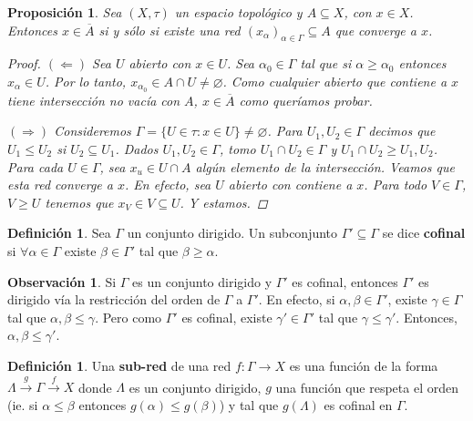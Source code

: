 \documentclass[12pt]{book}
\newtheorem{prop}[teo]{Proposición}
\theoremstyle{definition}
\newtheorem{obs}[teo]{Observación}
\newtheorem{defn}[teo]{Definición}
\let\emptyset\varnothing
\begin{document}
\begin{prop}
Sea $(X,\tau)$ un espacio topológico y $A\subseteq X$, con $x\in X$. Entonces $x\in \overline{A}$ si y sólo si existe una red $(x_\alpha)_{\alpha\in\Gamma}\subseteq A$ que converge a $x$.
\begin{proof}
$(\Longleftarrow)$ Sea $U$ abierto con $x\in U$. Sea $\alpha_0\in\Gamma$ tal que si $\alpha\geq \alpha_0$ entonces $x_\alpha\in U$. Por lo tanto, $x_{\alpha_0}\in A\cap U\neq \emptyset$. Como cualquier abierto que contiene a $x$ tiene intersección no vacía con $A$, $x\in\overline{A}$ como queríamos probar.

$(\Longrightarrow)$ Consideremos $\Gamma = \{U\in\tau : x\in U\}\neq \emptyset$. Para $U_1,U_2\in\Gamma$ decimos que $U_1\leq U_2$ si $U_2\subseteq U_1$. Dados $U_1,U_2\in\Gamma$, tomo $U_1\cap U_2\in\Gamma$ y $U_1\cap U_2 \geq U_1,U_2$. Para cada $U\in\Gamma$, sea $x_u\in U\cap A$ algún elemento de la intersección. Veamos que esta red converge a $x$. En efecto, sea $U$ abierto con contiene a $x$. Para todo $V\in\Gamma$, $V\geq U$ tenemos que $x_V \in V\subseteq U$. Y estamos.
\end{proof} 
\end{prop}

\begin{defn}
Sea $\Gamma$ un conjunto dirigido. Un subconjunto $\Gamma'\subseteq \Gamma$ se dice \textbf{cofinal} si $\forall \alpha\in\Gamma$ existe $\beta\in\Gamma'$ tal que $\beta\geq\alpha$.
\end{defn}

\begin{obs}
Si $\Gamma$ es un conjunto dirigido y $\Gamma'$ es cofinal, entonces $\Gamma'$ es dirigido vía la restricción del orden de $\Gamma$ a $\Gamma'$. En efecto, si $\alpha,\beta\in \Gamma'$, existe $\gamma\in\Gamma$ tal que $\alpha,\beta\leq \gamma$. Pero como $\Gamma'$ es cofinal, existe $\gamma'\in\Gamma'$ tal que $\gamma \leq \gamma'$. Entonces, $\alpha,\beta \leq \gamma'$.
\end{obs}

\begin{defn}
Una \textbf{sub-red} de una red $f:\Gamma\to X$ es una función de la forma $\Lambda\stackrel{g}{\longrightarrow} \Gamma\stackrel{f}{\longrightarrow} X$ donde $\Lambda$ es un conjunto dirigido, $g$ una función que respeta el orden (ie. si $\alpha\leq\beta$ entonces $g(\alpha)\leq g(\beta)$) y tal que $g(\Lambda)$ es cofinal en $\Gamma$.
\end{defn}
\end{document}
